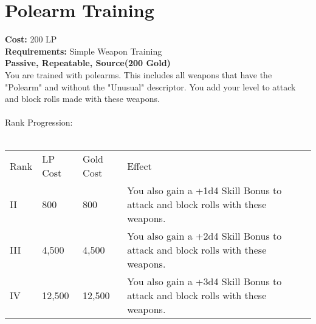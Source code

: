 \section{Polearm Training}\label{perk:polearmTraining}
\textbf{Cost:} 200 LP\\
\textbf{Requirements:} Simple Weapon Training\\
\textbf{Passive, Repeatable, Source(200 Gold)}\\
You are trained with polearms.
This includes all weapons that have the "Polearm" and without the "Unusual" descriptor.
You add your level to attack and block rolls made with these weapons.\\
\\
Rank Progression:\\
\\
\begin{longtable}{l | l | l | p{9cm}}
	Rank & LP Cost & Gold Cost & Effect\\
	II & 800 & 800 & You also gain a +1d4 Skill Bonus to attack and block rolls with these weapons.\\
	III & 4,500 & 4,500 & You also gain a +2d4 Skill Bonus to attack and block rolls with these weapons.\\
	IV & 12,500 & 12,500 & You also gain a +3d4 Skill Bonus to attack and block rolls with these weapons.\\
\end{longtable}